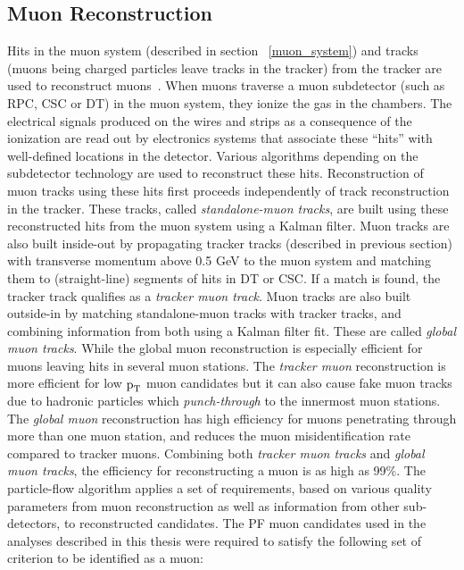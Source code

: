 \subsection{Muon Reconstruction}
\label{mu_recon}
Hits in the muon system (described in section ~\ref{muon_system}) and tracks (muons being charged particles leave tracks in the tracker) from the tracker are used to reconstruct muons~\cite{muon_recon2018}. When muons traverse a muon subdetector (such as RPC, CSC or DT) in the muon system, they ionize the gas in the chambers. The electrical signals produced on the wires and strips as a consequence of the ionization are read out by electronics systems that associate these ``hits'' with well-defined locations in the detector. Various algorithms depending on the subdetector technology are used to reconstruct these hits. Reconstruction of muon tracks using these hits first proceeds independently of track reconstruction in the tracker. These tracks, called \textit{standalone-muon tracks}, are built using these reconstructed hits from the muon system using a Kalman filter. Muon tracks are also built inside-out by propagating tracker tracks (described in previous section) with transverse momentum above 0.5 GeV to the muon system and matching them to (straight-line) segments of hits in DT or CSC. If a match is found, the tracker track qualifies as a \textit{tracker muon track}. Muon tracks are also  built outside-in  by matching standalone-muon tracks with tracker tracks, and combining information from both using a Kalman filter fit. These are called \textit{global muon tracks}. While the global muon reconstruction is especially efficient for muons leaving hits in several muon stations. The \textit{tracker muon} reconstruction is more efficient for low $\text{p}_\text{T}$ muon candidates but it can also cause fake muon tracks due to hadronic particles which \textit{punch-through} to the innermost muon stations. The \textit{global muon} reconstruction has  high efficiency for muons penetrating through more than one muon station, and reduces the muon misidentification rate compared to tracker muons. Combining both \textit{tracker muon tracks} and \textit{global muon tracks}, the efficiency for reconstructing a muon is as high as 99\%. The particle-flow algorithm applies a set of requirements, based on various quality parameters from muon reconstruction as well as information from other sub-detectors, to  reconstructed candidates. The PF muon candidates used in the analyses described in this thesis were required to satisfy the following set of criterion to be identified as a muon:

